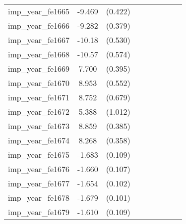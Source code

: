 {\begin{tabular}{l*{4}{cc}}
imp\_year\_fe1665&   -9.469\sym{***}&  (0.422)&                  &         &                  &         &                  &         \\
imp\_year\_fe1666&   -9.282\sym{***}&  (0.379)&                  &         &                  &         &                  &         \\
imp\_year\_fe1667&   -10.18\sym{***}&  (0.530)&                  &         &                  &         &                  &         \\
imp\_year\_fe1668&   -10.57\sym{***}&  (0.574)&                  &         &                  &         &                  &         \\
imp\_year\_fe1669&    7.700\sym{***}&  (0.395)&                  &         &                  &         &                  &         \\
imp\_year\_fe1670&    8.953\sym{***}&  (0.552)&                  &         &                  &         &                  &         \\
imp\_year\_fe1671&    8.752\sym{***}&  (0.679)&                  &         &                  &         &                  &         \\
imp\_year\_fe1672&    5.388\sym{***}&  (1.012)&                  &         &                  &         &                  &         \\
imp\_year\_fe1673&    8.859\sym{***}&  (0.385)&                  &         &                  &         &                  &         \\
imp\_year\_fe1674&    8.268\sym{***}&  (0.358)&                  &         &                  &         &                  &         \\
imp\_year\_fe1675&   -1.683\sym{***}&  (0.109)&                  &         &                  &         &                  &         \\
imp\_year\_fe1676&   -1.660\sym{***}&  (0.107)&                  &         &                  &         &                  &         \\
imp\_year\_fe1677&   -1.654\sym{***}&  (0.102)&                  &         &                  &         &                  &         \\
imp\_year\_fe1678&   -1.679\sym{***}&  (0.101)&                  &         &                  &         &                  &         \\
imp\_year\_fe1679&   -1.610\sym{***}&  (0.109)&                  &         &                  &         &                  &         \\

\end{tabular}}
